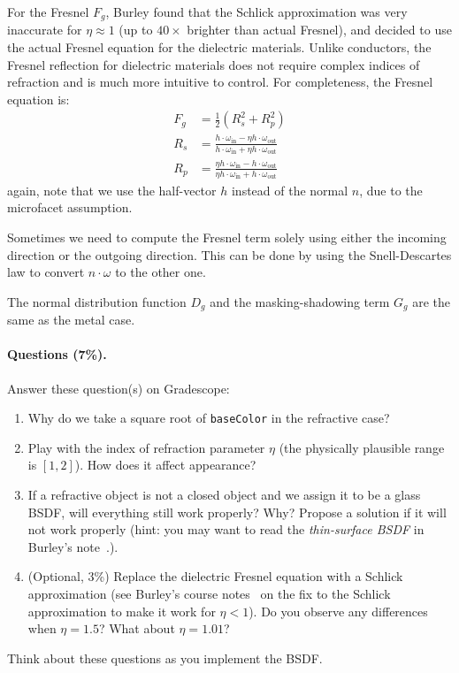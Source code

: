 For the Fresnel $F_g$, Burley found that the Schlick approximation was very inaccurate for $\eta \approx 1$ (up to $40 \times$ brighter than actual Fresnel), and decided to use the actual Fresnel equation for the dielectric materials. Unlike conductors, the Fresnel reflection for dielectric materials does not require complex indices of refraction and is much more intuitive to control. For completeness, the Fresnel equation is:
\begin{equation}
\begin{aligned}
F_g &= \frac{1}{2}\left(R_s^2 + R_p^2\right) \\
R_s &= \frac{h \cdot \omega_{\text{in}} - \eta h \cdot \omega_{\text{out}}}{h \cdot \omega_{\text{in}} + \eta h \cdot \omega_{\text{out}}} \\
R_p &= \frac{\eta h \cdot \omega_{\text{in}} - h \cdot \omega_{\text{out}}}{\eta h \cdot \omega_{\text{in}} + h \cdot \omega_{\text{out}}}
\end{aligned}
\end{equation}
again, note that we use the half-vector $h$ instead of the normal $n$, due to the microfacet assumption.

Sometimes we need to compute the Fresnel term solely using either the incoming direction or the outgoing direction. This can be done by using the Snell-Descartes law to convert $n \cdot \omega$ to the other one.

The normal distribution function $D_g$ and the masking-shadowing term $G_g$ are the same as the metal case.

\paragraph{Questions (7\%).} Answer these question(s) on Gradescope:
\begin{enumerate}
    \item Why do we take a square root of \lstinline{baseColor} in the refractive case?
    \item Play with the index of refraction parameter $\eta$ (the physically plausible range is $[1, 2]$). How does it affect appearance?
    \item If a refractive object is not a closed object and we assign it to be a glass BSDF, will everything still work properly? Why? Propose a solution if it will not work properly (hint: you may want to read the \emph{thin-surface BSDF} in Burley's note~\cite{Burley:2015:EDB}.).
    \item (Optional, 3\%) Replace the dielectric Fresnel equation with a Schlick approximation (see Burley's course notes~\cite{Burley:2015:EDB} on the fix to the Schlick approximation to make it work for $\eta < 1$). Do you observe any differences when $\eta=1.5$? What about $\eta=1.01$?
\end{enumerate}
Think about these questions as you implement the BSDF.

